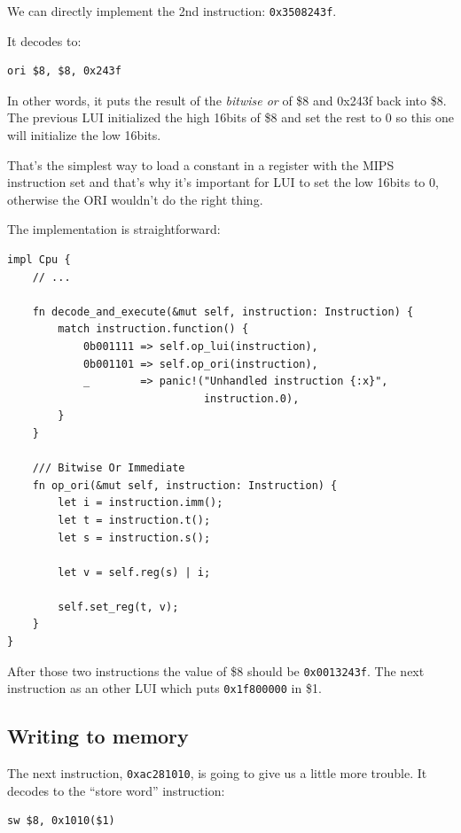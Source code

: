\documentclass[a4paper]{article}
\newcommand{\code}[1] {\texttt{#1}}
\begin{document}
We can directly implement the 2nd instruction: \code{0x3508243f}.

It decodes to:

\begin{lstlisting}[language=assembly]
ori $8, $8, 0x243f
\end{lstlisting}

In other words, it puts the result of the \emph{bitwise or} of \$8 and
0x243f back into \$8. The previous LUI initialized the high
16bits of \$8 and set the rest to 0 so this one will initialize the
low 16bits.

That's the simplest way to load a constant in a register with the MIPS
instruction set and that's why it's important for LUI to set the low
16bits to 0, otherwise the ORI wouldn't do the right thing.

The implementation is straightforward:

\begin{lstlisting}
impl Cpu {
    // ...

    fn decode_and_execute(&mut self, instruction: Instruction) {
        match instruction.function() {
            0b001111 => self.op_lui(instruction),
            0b001101 => self.op_ori(instruction),
            _        => panic!("Unhandled instruction {:x}",
                               instruction.0),
        }
    }

    /// Bitwise Or Immediate
    fn op_ori(&mut self, instruction: Instruction) {
        let i = instruction.imm();
        let t = instruction.t();
        let s = instruction.s();

        let v = self.reg(s) | i;

        self.set_reg(t, v);
    }
}
\end{lstlisting}

After those two instructions the value of \$8 should be
\code{0x0013243f}. The next instruction as an other LUI which puts
\code{0x1f800000} in \$1.

\subsection{Writing to memory}

The next instruction, \code{0xac281010}, is going to give us a
little more trouble. It decodes to the ``store word'' instruction:

\begin{lstlisting}[language=assembly]
sw $8, 0x1010($1)
\end{lstlisting}
\end{document}

